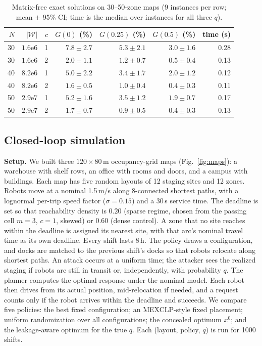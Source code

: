 \documentclass[10pt,twocolumn,letterpaper]{article}
\theoremstyle{remark}
\newcommand{\W}{\mathcal{W}}
\begin{document}
\begin{table}[!t]
\centering
\caption{Matrix-free exact solutions on 30--50-zone maps (9 instances per row; mean $\pm$ 95\% CI; time is the median over instances for all three $q$).}
\label{tab:scale}
\footnotesize\setlength{\tabcolsep}{3.5pt}
\begin{tabular}{@{}rrrrrrr@{}}
\toprule
$N$ & $|\W|$ & $c$ & $G(0)$ (\%) & $G(0.25)$ (\%) & $G(0.5)$ (\%) & time (s)\\
\midrule
30 & $1.6\mathrm{e}6$ & 1 & $7.8\pm2.7$ & $5.3\pm2.1$ & $3.0\pm1.6$ & 0.28\\
30 & $1.6\mathrm{e}6$ & 2 & $2.0\pm1.1$ & $1.2\pm0.7$ & $0.5\pm0.4$ & 0.13\\
40 & $8.2\mathrm{e}6$ & 1 & $5.0\pm2.2$ & $3.4\pm1.7$ & $2.0\pm1.2$ & 0.12\\
40 & $8.2\mathrm{e}6$ & 2 & $1.6\pm0.5$ & $1.0\pm0.4$ & $0.4\pm0.3$ & 0.11\\
50 & $2.9\mathrm{e}7$ & 1 & $5.2\pm1.6$ & $3.5\pm1.2$ & $1.9\pm0.7$ & 0.17\\
50 & $2.9\mathrm{e}7$ & 2 & $1.7\pm0.7$ & $0.9\pm0.5$ & $0.4\pm0.3$ & 0.13\\
\bottomrule
\end{tabular}
\end{table}

\subsection{Closed-loop simulation}
\textbf{Setup.} We built three $120\times80$\,m occupancy-grid maps (Fig.~\ref{fig:maps}): a warehouse with shelf rows, an office with rooms and doors, and a campus with buildings. Each map has five random layouts of 12 staging sites and 12 zones. Robots move at a nominal 1.5\,m/s along 8-connected shortest paths, with a lognormal per-trip speed factor ($\sigma=0.15$) and a 30\,s service time. The deadline is set so that reachability density is $0.20$ (sparse regime, chosen from the passing cell $m=3$, $c=1$, skewed) or $0.60$ (dense control). A zone that no site reaches within the deadline is assigned its nearest site, with that arc's nominal travel time as its own deadline. Every shift lasts 8\,h. The policy draws a configuration, and docks are matched to the previous shift's docks so that robots relocate along shortest paths. An attack occurs at a uniform time; the attacker sees the realized staging if robots are still in transit or, independently, with probability $q$. The planner computes the optimal response under the nominal model. Each robot then drives from its actual position, mid-relocation if needed, and a request counts only if the robot arrives within the deadline and succeeds. We compare five policies: the best fixed configuration; an MEXCLP-style fixed placement; uniform randomization over all configurations; the concealed optimum $x^0$; and the leakage-aware optimum for the true $q$. Each (layout, policy, $q$) is run for 1000 shifts.
\end{document}
